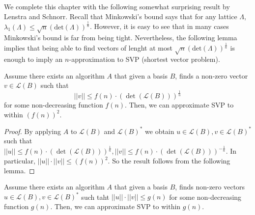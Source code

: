 We complete this chapter with the following somewhat surprising result by
Lenstra and Schnorr. Recall that Minkowski's bound says that for any lattice
$\Lambda$,
$\lambda_1(\Lambda)\leq\sqrt{n}(\mathrm{det}(\Lambda))^{\frac{1}{n}}$. However,
it is easy to see that in many cases Minkowski's bound is far from being 
tight. Nevertheless, the following lemma implies that being able to find
vectors of lenght at most $\sqrt{n}(\mathrm{det}(\Lambda))^{\frac{1}{n}}$ is 
enough to imply an $n$-approximation to SVP (shortest vector problem).
\begin{lemma}
  Assume there exists an algorithm $A$ that given a basis $B$, finds a non-zero
  vector $v\in\mathcal{L}(B)$ such that
  \begin{equation}
    ||v|| \leq f(n)\cdot(\det(\mathcal{L}(B)))^{\frac{1}{n}}
  \end{equation}
  for some non-decreasing function $f(n)$. Then, we can approximate SVP to
  within $(f(n))^2$.
\end{lemma}
\begin{proof}
  By applying $A$ to $\mathcal{L}(B)$ and $\mathcal{L}(B)^*$ we obtain
  $u\in\mathcal{L}(B), v\in\mathcal{L}(B)^*$ such that $||u||\leq
  f(n)\cdot(\det(\mathcal{L}(B)))^{\frac{1}{n}},||v||\leq
  f(n)\cdot(\det(\mathcal{L}(B)))^{-\frac{1}{n}}$. In particular,
  $||u||\cdot||v||\leq (f(n))^2$. So the result follows from the following
  lemma.
\end{proof}
\begin{lemma}
  Assume there exists an algorithm $A$ that given a basis $B$, finds non-zero
  vectors $u\in\mathcal{L}(B), v\in\mathcal{L}(B)^*$ such taht
  $||u||\cdot||v||\leq g(n)$ for some non-decreasing function $g(n)$. Then, we
  can approximate SVP to within $g(n)$.
\end{lemma}
